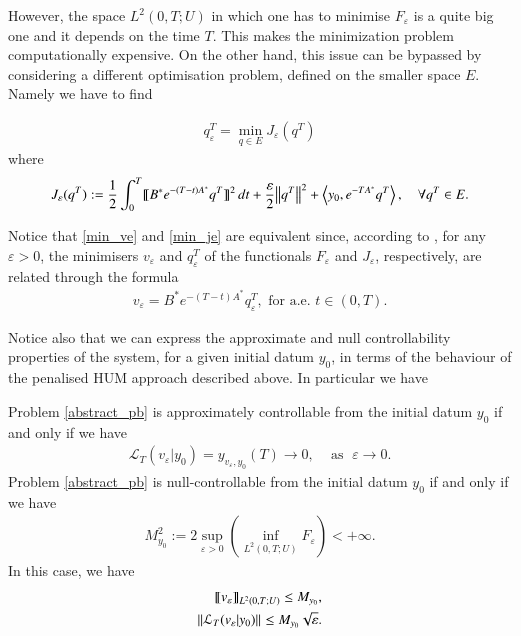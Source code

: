 However, the space $L^2(0,T;U)$ in which one has to minimise $F_\varepsilon$ is a quite big one and it depends on the time $T$. This makes the minimization problem computationally expensive. On the other hand, this issue can be bypassed by considering a different optimisation problem, defined on the smaller space $E$. Namely we have to find  

\begin{align}\label{min_je}
	q^T_\varepsilon=\min_{q\in E} J_\varepsilon (q^T)
\end{align}
where
\begin{align*}
	J_\varepsilon(q^T):=\frac{1}{2}\int_0^T\llbracket B^*e^{-(T-t)A^*}q^T\rrbracket^2\,dt+\frac{\varepsilon}{2}{\left\|q^T\right\|}_{}^2 + \left\langle y_0,e^{-TA^*}q^T\right\rangle, \quad \forall q^T\in E.
\end{align*}

Notice that \eqref{min_ve} and \eqref{min_je} are equivalent since, according to \cite[Proosition 1.5]{boyer2013penalised}, for any $\varepsilon > 0$, the minimisers $v_\varepsilon$ and $q_\varepsilon^T$ of the functionals $F_\varepsilon$ and $J_\varepsilon$, respectively, are related through the formula
\begin{align*}
	v_\varepsilon = B^*e^{-(T-t)A^*}q_\varepsilon^T, \textrm{ for a.e. } t\in(0,T).
\end{align*} 

Notice also that we can express the approximate and null controllability properties of the system, for a given initial datum $y_0$, in terms of the behaviour of the penalised HUM approach described above. In particular we have 

\begin{theorem}
Problem \eqref{abstract_pb} is approximately controllable from the initial datum $y_0$ if and only if we have
\begin{align}\label{approx_control_cond}
	\mathcal{L}_T(v_\varepsilon|y_0) = y_{v_\varepsilon,y_0}(T)\rightarrow 0,\;\;\;\textrm{ as }\;\varepsilon\to 0.
\end{align}
Problem \eqref{abstract_pb} is null-controllable from the initial datum $y_0$ if and only if we have
\begin{align}\label{null_control_cond}
	M_{y_0}^2:=2\sup_{\varepsilon>0}\left( \inf_{L^2(0,T;U)}F_\varepsilon\right)<+\infty.
\end{align}
In this case, we have 
\begin{align}\label{null_control_est}
	\llbracket v_\varepsilon\rrbracket_{L^2(0,T;U)}\leq M_{y_0},\nonumber
	\\
	{\left\|\mathcal L_T(v_\varepsilon|y_0)\right\|}_{}\leq M_{y_0}\sqrt{\varepsilon}.
\end{align} 
\end{theorem} 

